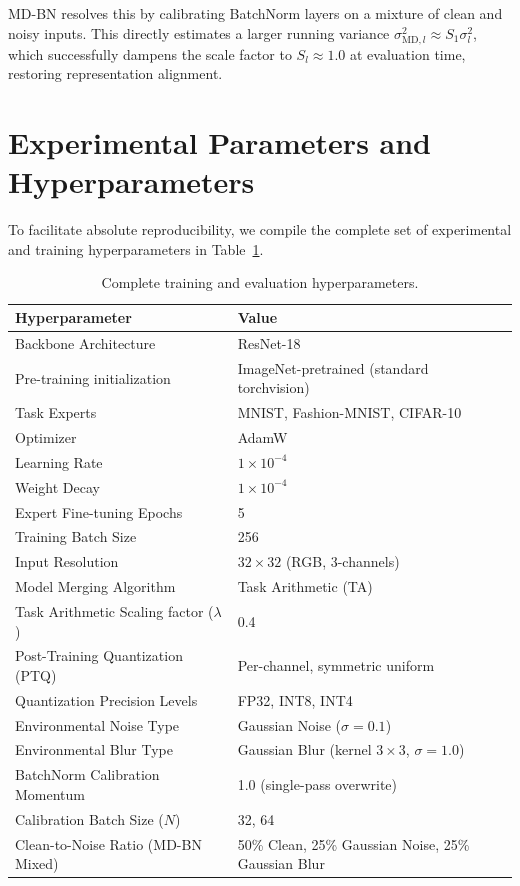 \documentclass{article}
\theoremstyle{plain}
\theoremstyle{definition}
\theoremstyle{remark}
\begin{document}
MD-BN resolves this by calibrating BatchNorm layers on a mixture of clean and noisy inputs. This directly estimates a larger running variance $\sigma^2_{\text{MD},l} \approx S_1 \sigma^2_l$, which successfully dampens the scale factor to $S_l \approx 1.0$ at evaluation time, restoring representation alignment.

\section{Experimental Parameters and Hyperparameters}
\label{sec:appendix_hyperparameters}
To facilitate absolute reproducibility, we compile the complete set of experimental and training hyperparameters in Table~\ref{tab:hyperparameters}.

\begin{table}[htbp]
\caption{Complete training and evaluation hyperparameters.}
\label{tab:hyperparameters}
\begin{center}
\begin{small}
\begin{tabular}{l l}
\toprule
\textbf{Hyperparameter} & \textbf{Value} \\
\midrule
Backbone Architecture & ResNet-18 \\
Pre-training initialization & ImageNet-pretrained (standard torchvision) \\
Task Experts & MNIST, Fashion-MNIST, CIFAR-10 \\
Optimizer & AdamW \\
Learning Rate & $1 \times 10^{-4}$ \\
Weight Decay & $1 \times 10^{-4}$ \\
Expert Fine-tuning Epochs & 5 \\
Training Batch Size & 256 \\
Input Resolution & $32 \times 32$ (RGB, 3-channels) \\
Model Merging Algorithm & Task Arithmetic (TA) \\
Task Arithmetic Scaling factor ($\lambda$) & 0.4 \\
Post-Training Quantization (PTQ) & Per-channel, symmetric uniform \\
Quantization Precision Levels & FP32, INT8, INT4 \\
Environmental Noise Type & Gaussian Noise ($\sigma = 0.1$) \\
Environmental Blur Type & Gaussian Blur (kernel $3 \times 3$, $\sigma = 1.0$) \\
BatchNorm Calibration Momentum & 1.0 (single-pass overwrite) \\
Calibration Batch Size ($N$) & 32, 64 \\
Clean-to-Noise Ratio (MD-BN Mixed) & 50\% Clean, 25\% Gaussian Noise, 25\% Gaussian Blur \\
\bottomrule
\end{tabular}
\end{small}
\end{center}
\end{table}
\end{document}
